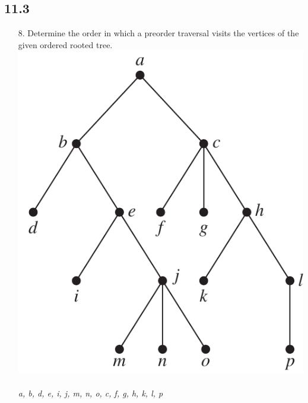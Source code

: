 \subsection{11.3}
\begin{itemize}
    \item[8.] Determine the order in which a preorder
          traversal visits the vertices of the given ordered rooted tree. \\
          \includegraphics[scale=0.6]{img/11_3_8_tree.png} \\
          \answer \\
          \textit{a, b, d, e, i, j, m, n, o, c, f, g, h, k, l, p}

 \newpage


\end{itemize}
